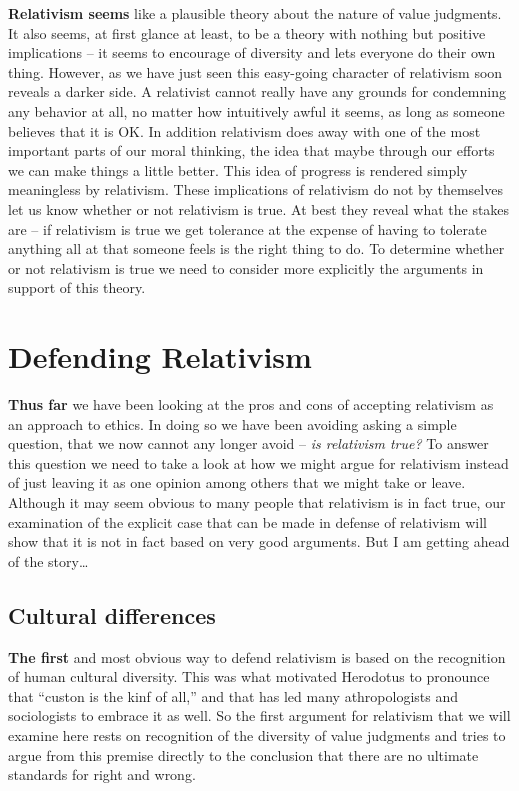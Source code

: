 \documentclass[]{book}
\begin{document}
\textbf{Relativism seems} like a plausible theory about the nature of value judgments. It also seems, at first glance at least, to be a theory with nothing but positive implications -- it seems to encourage of diversity and lets everyone do their own thing. However, as we have just seen this easy-going character of relativism soon reveals a darker side. A relativist cannot really have any grounds for condemning any behavior at all, no matter how intuitively awful it seems, as long as someone believes that it is OK. In addition relativism does away with one of the most important parts of our moral thinking, the idea that maybe through our efforts we can make things a little better. This idea of progress is rendered simply meaningless by relativism. These implications of relativism do not by themselves let us know whether or not relativism is true. At best they reveal what the stakes are -- if relativism is true we get tolerance at the expense of having to tolerate anything all at that someone feels is the right thing to do. To determine whether or not relativism is true we need to consider more explicitly the arguments in support of this theory.

\hypertarget{defending-relativism}{%
\section{Defending Relativism}\label{defending-relativism}}

\textbf{Thus far} we have been looking at the pros and cons of accepting relativism as an approach to ethics. In doing so we have been avoiding asking a simple question, that we now cannot any longer avoid -- \emph{is relativism true?} To answer this question we need to take a look at how we might argue for relativism instead of just leaving it as one opinion among others that we might take or leave. Although it may seem obvious to many people that relativism is in fact true, our examination of the explicit case that can be made in defense of relativism will show that it is not in fact based on very good arguments. But I am getting ahead of the story\ldots{}

\hypertarget{cultural-differences}{%
\subsection*{Cultural differences}\label{cultural-differences}}


\textbf{The first} and most obvious way to defend relativism is based on the recognition of human cultural diversity. This was what motivated Herodotus to pronounce that ``custon is the kinf of all,'' and that has led many athropologists and sociologists to embrace it as well. So the first argument for relativism that we will examine here rests on recognition of the diversity of value judgments and tries to argue from this premise directly to the conclusion that there are no ultimate standards for right and wrong.
\end{document}
